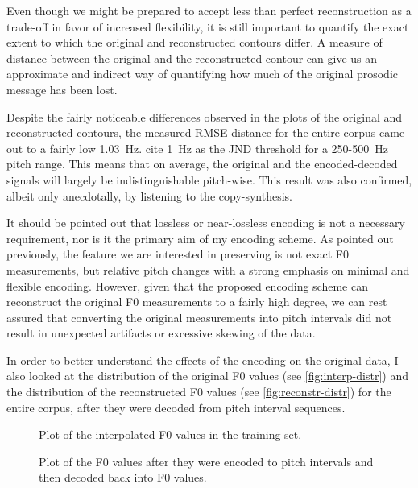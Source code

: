 Even though we might be prepared to accept less than perfect reconstruction as a trade-off in favor of increased flexibility, it is still important to quantify the exact extent to which the original and reconstructed contours differ.
A measure of distance between the original and the reconstructed contour can give us an approximate and indirect way of quantifying how much of the original prosodic message has been lost.

Despite the fairly noticeable differences observed in the plots of the original and reconstructed contours, the measured \ac{RMSE} distance for the entire corpus came out to a fairly low 1.03~Hz.
\citet{Pulkki2015Communication} cite 1~Hz as the \ac{JND} threshold for a 250-500~Hz pitch range.
This means that on average, the original and the encoded-decoded signals will largely be indistinguishable pitch-wise.
This result was also confirmed, albeit only anecdotally, by listening to the copy-synthesis.

It should be pointed out that lossless or near-lossless encoding is not a necessary requirement, nor is it the primary aim of my encoding scheme.
As pointed out previously, the feature we are interested in preserving is not exact \ac{F0} measurements, but relative pitch changes with a strong emphasis on minimal and flexible encoding.
However, given that the proposed encoding scheme can reconstruct the original \ac{F0} measurements to a fairly high degree, we can rest assured that converting the original measurements into pitch intervals did not result in unexpected artifacts or excessive skewing of the data.

In order to better understand the effects of the encoding on the original data, I also looked at the distribution of the original \ac{F0} values (see \autoref{fig:interp-distr}) and the distribution of the reconstructed \ac{F0} values (see \autoref{fig:reconstr-distr}) for the entire corpus, after they were decoded from pitch interval sequences. 


\begin{figure}[h]
\centering
\resizebox{\textwidth}{!}{}
\caption[Interpolated \ac{F0} train distribution]{Plot of the interpolated \ac{F0} values in the training set.}
\label{fig:interp-distr}
\end{figure}


\begin{figure}[h]
\centering
\resizebox{\textwidth}{!}{}
\caption[Reconstructed \ac{F0} train distribution]{Plot of the \ac{F0} values after they were encoded to pitch intervals and then decoded back into \ac{F0} values.}
\label{fig:reconstr-distr}
\end{figure}


